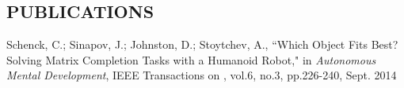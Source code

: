 \documentclass[margin, 10pt]{res} %
\begin{document}
\begin{resume}

\section{PUBLICATIONS}

Schenck, C.; Sinapov, J.; Johnston, D.; Stoytchev, A., ``Which Object Fits Best?
Solving Matrix Completion Tasks with a Humanoid Robot," in {\sl Autonomous
Mental Development}, IEEE Transactions on , vol.6, no.3, pp.226-240, Sept. 2014

\end{resume}
\end{document}
